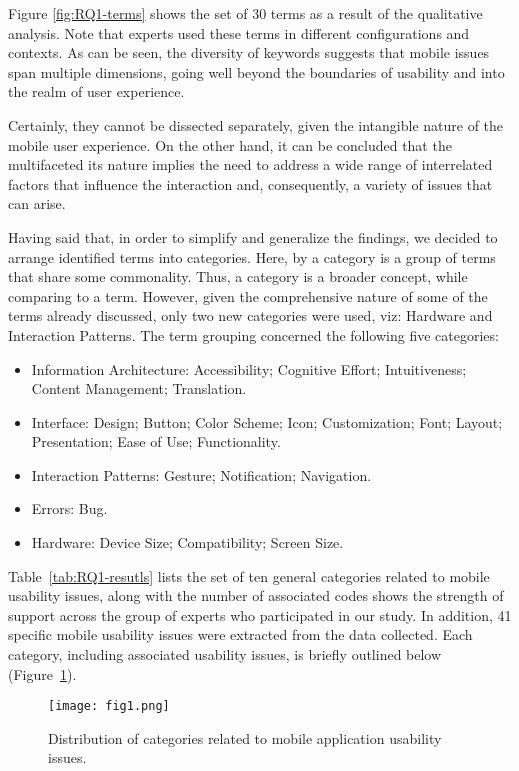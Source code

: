 \documentclass[preprint,12pt,number]{elsarticle}
\begin{document}
Figure \ref{fig:RQ1-terms} shows the set of 30 terms as a result of the qualitative analysis. Note that experts used these terms in different configurations and contexts. As can be seen, the diversity of keywords suggests that mobile issues span multiple dimensions, going well beyond the boundaries of usability and into the realm of user experience.

Certainly, they cannot be dissected separately, given the intangible nature of the mobile user experience. On the other hand, it can be concluded that the multifaceted its nature  implies the need to address a wide range of interrelated factors that influence the interaction and, consequently, a variety of issues that can arise. 

Having said that, in order to simplify and generalize the findings, we decided to arrange identified terms into categories. Here, by a category is a group of terms that share some commonality. Thus, a category is a broader concept, while comparing to a term. However, given the comprehensive nature of some of the terms already discussed, only two new categories were used, viz: Hardware and Interaction Patterns. 
The term grouping concerned the following five categories:
\begin{itemize}
    \item Information Architecture: Accessibility; Cognitive Effort; Intuitiveness; Content Management; Translation.
    \item Interface: Design; Button; Color Scheme; Icon; Customization; Font; Layout; Presentation; Ease of Use; Functionality.
    \item Interaction Patterns: Gesture; Notification; Navigation.
    \item Errors: Bug.
    \item Hardware: Device Size; Compatibility; Screen Size.
\end{itemize}

Table~\ref{tab:RQ1-resutls} lists the set of ten general categories related to mobile usability issues, along with the number of associated codes shows the strength of support across the group of experts who participated in our study. In addition, 41 specific mobile usability issues were extracted from the data collected. Each category, including associated usability issues, is briefly outlined below (Figure~\ref{fig:categories-share}).

\begin{figure}[h]
    \centering
    \texttt{[image: fig1.png]}
    \caption{Distribution of categories related to mobile application usability issues.}
    \label{fig:categories-share}
\end{figure}
\end{document}
